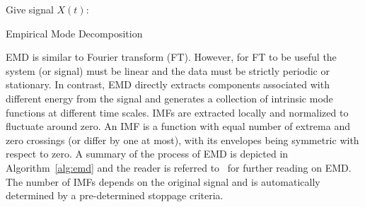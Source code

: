 \begin{algorithm}[h!]
 \SetAlgoLined
 Give signal $X(t)$:\\
 \caption{Empirical Mode Decomposition}
 \label{alg:emd}
\end{algorithm}

EMD is similar to Fourier transform (FT).  However, for FT to be useful the system (or signal) must be linear and the data must 
be strictly periodic or stationary.  In contrast, EMD directly extracts components associated with different energy from the signal 
and generates a collection of intrinsic mode functions at different time scales.  IMFs are extracted locally and 
normalized to fluctuate around zero.  An IMF is a function with equal number of extrema 
and zero crossings (or differ by one at most), with its envelopes being symmetric with respect to zero.  A summary of the process of 
EMD is depicted in Algorithm~\ref{alg:emd} and the 
reader is referred to~\cite{EMD} for further reading on EMD.  The number of IMFs depends on the original signal and is automatically determined
by a pre-determined stoppage criteria.

